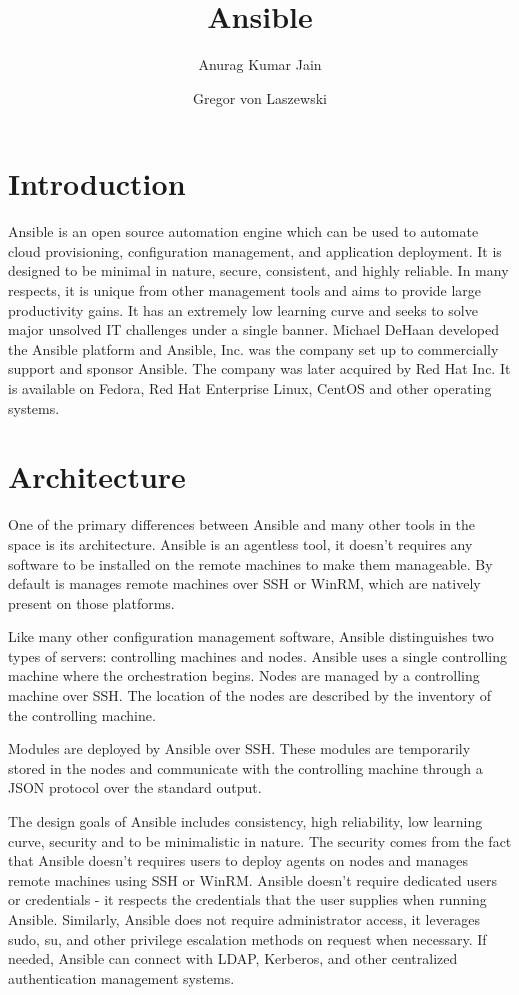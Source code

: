 \documentclass[9pt,twocolumn,twoside]{styles/osajnl}
\title{Ansible}
\author[1]{Anurag Kumar Jain}
\author[1,*]{Gregor von Laszewski}
\affil[1]{School of Informatics and Computing, Bloomington, IN 47408, U.S.A.}
\affil[*]{Corresponding authors: laszewski@gmail.com}
\begin{document}
\maketitle

\section{Introduction}

Ansible is an open source automation engine which can be used to
automate cloud provisioning, configuration management, and application
deployment. It is designed to be minimal in nature, secure,
consistent, and highly reliable.\cite{www-ansible3} In many respects,
it is unique from other management tools and aims to provide large
productivity gains. It has an extremely low learning curve and seeks
to solve major unsolved IT challenges under a single banner.  Michael
DeHaan developed the Ansible platform and Ansible, Inc. was the
company set up to commercially support and sponsor Ansible. The
company was later acquired by Red Hat Inc. It is available on Fedora,
Red Hat Enterprise Linux, CentOS and other operating
systems.\cite{www-ansible-wikipedia}

\section{Architecture}

One of the primary differences between Ansible and many other tools in
the space is its architecture. Ansible is an agentless tool, it
doesn't requires any software to be installed on the remote machines
to make them manageable. By default is manages remote machines over
SSH or WinRM, which are natively present on those
platforms.\cite{www-ansible}

Like many other configuration management software, Ansible
distinguishes two types of servers: controlling machines and
nodes. Ansible uses a single controlling machine where the
orchestration begins. Nodes are managed by a controlling machine over
SSH. The location of the nodes are described by the inventory of the
controlling machine.\cite{www-ansible3}

Modules are deployed by Ansible over SSH. These modules are
temporarily stored in the nodes and communicate with the controlling
machine through a JSON protocol over the standard
output.\cite{www-ansible}

The design goals of Ansible includes consistency, high reliability,
low learning curve, security and to be minimalistic in nature. The
security comes from the fact that Ansible doesn't requires users to
deploy agents on nodes and manages remote machines using SSH or
WinRM. Ansible doesn't require dedicated users or credentials - it
respects the credentials that the user supplies when running
Ansible. Similarly, Ansible does not require administrator access, it
leverages sudo, su, and other privilege escalation methods on request
when necessary.\cite{github-ansible} If needed, Ansible can connect
with LDAP, Kerberos, and other centralized authentication management
systems.\cite{www-ansible2}
\end{document}
